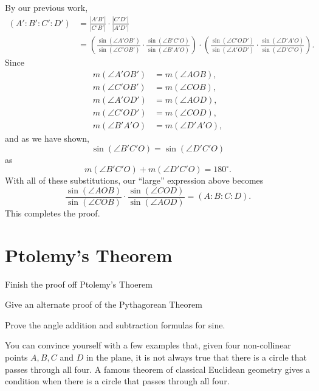 \documentclass[newpage,hints,handout]{ximera}
\begin{document}
\begin{problem}
\begin{freeResponse}
By our previous work, 
\begin{align*}
(A':B':C':D') &=\frac{|A'B'|}{|C'B'|}\cdot\frac{|C'D'|}{|A'D'|}\\
&=\left(\frac{\sin(\angle A'OB')}{\sin(\angle C'OB')}\cdot 
\frac{
\sin(\angle B'C'O)
}{
\sin(\angle B'A'O)
}\right) 
\cdot\left(\frac{
\sin(\angle C'OD')
}{
\sin(\angle A'OD')
}\cdot\frac{\sin(\angle D'A'O)}{\sin(\angle D'C'O)}\right).
\end{align*}
Since 
\begin{align*}
m(\angle A'OB') &= m(\angle AOB),\\
m(\angle C'OB') &= m(\angle COB),\\
m(\angle A'OD') &= m(\angle AOD),\\
m(\angle C'OD') &= m(\angle COD),\\
m(\angle B'A'O) &= m(\angle D'A'O),
\end{align*}
and as we have shown, 
\[
\sin(\angle B'C'O) = \sin(\angle D'C'O)
\]
as 
\[
m(\angle B'C'O) + m(\angle D'C'O) = 180^\circ.
\]
With all of these substitutions, our ``large'' expression above becomes
\[
\frac{\sin(\angle AOB)}{\sin(\angle COB)} \cdot\frac{
\sin(\angle COD)
}{
\sin(\angle AOD)
} = (A:B:C:D). 
\]
This completes the proof. 
\end{freeResponse}
\end{problem}








\section{Ptolemy's Theorem}

\begin{listOutcomes}
 \item Finish the proof off Ptolemy's Thoerem
 \item Give an alternate proof of the Pythagorean Theorem
 \item Prove the angle addition and subtraction formulas for sine.
\end{listOutcomes}

You can  convince yourself with a few examples that, given four
non-collinear points $A,B,C$ and $D$ in the plane, it is not always
true that there is a circle that passes through all four. A famous
theorem of classical Euclidean geometry gives a condition when there
is a circle that passes through all four.
\end{document}
